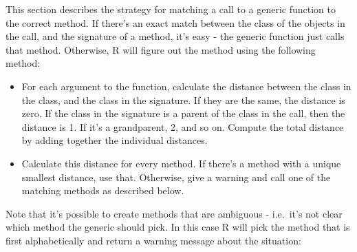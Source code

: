This section describes the strategy for matching a call to a generic
function to the correct method. If there's an exact match between the
class of the objects in the call, and the signature of a method, it's
easy - the generic function just calls that method. Otherwise, R will
figure out the method using the following method:

\begin{itemize}
\item
  For each argument to the function, calculate the distance between the
  class in the class, and the class in the signature. If they are the
  same, the distance is zero. If the class in the signature is a parent
  of the class in the call, then the distance is 1. If it's a
  grandparent, 2, and so on. Compute the total distance by adding
  together the individual distances.
\item
  Calculate this distance for every method. If there's a method with a
  unique smallest distance, use that. Otherwise, give a warning and call
  one of the matching methods as described below.
\end{itemize}

Note that it's possible to create methods that are ambiguous - i.e.~it's
not clear which method the generic should pick. In this case R will pick
the method that is first alphabetically and return a warning message
about the situation:

\begin{Shaded}
\begin{Highlighting}[]
\NormalTok{(}\NormalTok{)}
\NormalTok{(}\NormalTok{, } \NormalTok{)}
\NormalTok{(}\NormalTok{, } \NormalTok{)}
\NormalTok{(}\NormalTok{, } \NormalTok{)}

\NormalTok{(}\NormalTok{, }\NormalTok{(}\NormalTok{)) }
\NormalTok{(}\NormalTok{, }\NormalTok{(}\NormalTok{, }\NormalTok{), }\NormalTok{)}
\NormalTok{(}\NormalTok{, }\NormalTok{(}\NormalTok{, }\NormalTok{), }\NormalTok{)}
    
\NormalTok{(}\NormalTok{(}\NormalTok{), }\NormalTok{(}\NormalTok{))}
\end{Highlighting}
\end{Shaded}

